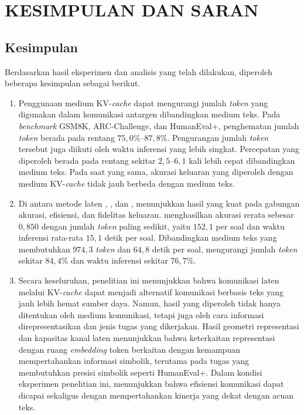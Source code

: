 \chapter{KESIMPULAN DAN SARAN}

\section{Kesimpulan}
\label{sec:kesimpulan}

Berdasarkan hasil eksperimen dan analisis yang telah dilakukan, diperoleh
beberapa kesimpulan sebagai berikut.

\begin{enumerate}

    \item
    Penggunaan medium KV-\textit{cache} dapat mengurangi jumlah \textit{token}
    yang digunakan dalam komunikasi antargen dibandingkan medium teks.
    Pada \textit{benchmark} GSM8K, ARC-Challenge, dan HumanEval+, penghematan jumlah
    \textit{token} berada pada rentang $75{,}0\%$--$87{,}8\%$.
    Pengurangan jumlah \textit{token} tersebut juga diikuti oleh waktu
    inferensi yang lebih singkat. Percepatan yang diperoleh berada pada
    rentang sekitar $2{,}5$--$6{,}1$ kali lebih cepat dibandingkan medium teks.
    Pada saat yang sama, akurasi keluaran yang diperoleh dengan medium KV-\textit{cache}
    tidak jauh berbeda dengan medium teks.

    \item
    Di antara metode laten , , dan ,  menunjukkan hasil
    yang kuat pada gabungan akurasi, efisiensi, dan fidelitas keluaran.
     menghasilkan akurasi rerata sebesar $0{,}850$ dengan 
    jumlah \textit{token} paling sedikit, yaitu $152{,}1$ per soal dan
    waktu inferensi rata-rata $15{,}1$ detik per soal. Dibandingkan medium
    teks yang membutuhkan $974{,}3$ \textit{token} dan $64{,}8$ detik per
    soal,  mengurangi jumlah \textit{token} sekitar $84{,}4\%$
    dan waktu inferensi sekitar $76{,}7\%$.

    \item
    Secara keseluruhan, penelitian ini menunjukkan bahwa komunikasi laten
    melalui KV-\textit{cache} dapat menjadi alternatif komunikasi berbasis
    teks yang jauh lebih hemat sumber daya. Namun, hasil yang diperoleh tidak
    hanya ditentukan oleh medium komunikasi, tetapi juga oleh cara informasi
    direpresentasikan dan jenis tugas yang dikerjakan. Hasil geometri
    representasi dan kapasitas kanal laten menunjukkan bahwa keterkaitan
    representasi dengan ruang \textit{embedding} token berkaitan dengan
    kemampuan mempertahankan informasi simbolik, terutama pada tugas yang
    membutuhkan presisi simbolik seperti HumanEval+. Dalam kondisi eksperimen
    penelitian ini,  menunjukkan bahwa efisiensi komunikasi dapat
    dicapai sekaligus dengan mempertahankan kinerja yang dekat dengan acuan
    teks.

\end{enumerate}

